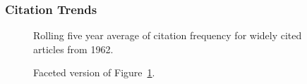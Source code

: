\documentclass[
  10pt,
  letterpaper,
  DIV=11,
  numbers=noendperiod,
  twoside]{scrartcl}
\begin{document}
\subsubsection*{Citation Trends}\label{sec-trends-1962}

\begin{figure}


\caption{\label{fig-citation-spaghetti-1962}Rolling five year average of
citation frequency for widely cited articles from 1962.}

\end{figure}%

\begin{figure}


\caption{\label{fig-citation-facet-1962}Faceted version of
Figure~\ref{fig-citation-spaghetti-1962}.}

\end{figure}%
\end{document}
